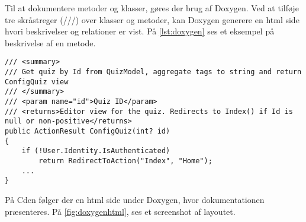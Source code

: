 Til at dokumentere metoder og klasser, gøres der brug af Doxygen. Ved at tilføje tre skråstreger (///) over klasser og metoder, kan Doxygen generere en html side hvori beskrivelser og relationer er vist.
På \ref{lst:doxygen} ses et eksempel på beskrivelse af en metode.

\begin{lstlisting}[caption=Eksempel på Doxygen notation, label=lst:doxygen]
/// <summary>
/// Get quiz by Id from QuizModel, aggregate tags to string and return ConfigQuiz view
/// </summary>
/// <param name="id">Quiz ID</param>
/// <returns>Editor view for the quiz. Redirects to Index() if Id is null or non-positive</returns>
public ActionResult ConfigQuiz(int? id)
{
	if (!User.Identity.IsAuthenticated)
		return RedirectToAction("Index", "Home");
	...
}
\end{lstlisting}

På Cden følger der en html side under Doxygen, hvor dokumentationen præsenteres. På \ref{fig:doxygenhtml}, ses et screenshot af layoutet.

